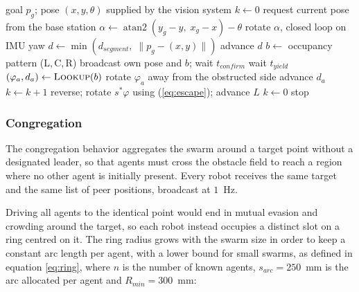 \documentclass[conference]{IEEEtran}
\begin{document}
\begin{algorithm}
\caption{Goal-directed navigation with obstacle avoidance}
\label{alg:nav}
\begin{algorithmic}[1]
\REQUIRE goal $p_g$; pose $(x,y,\theta)$ supplied by the vision system
\STATE $k \leftarrow 0$ 
    \STATE request current pose from the base station
    \STATE $\alpha \leftarrow \operatorname{atan2}(y_g - y,\; x_g - x) - \theta$
        \STATE rotate $\alpha$, closed loop on IMU yaw
    \ENDIF
    \STATE $d \leftarrow \min \left( d_{segment},\; \lVert p_g - (x,y) \rVert \right)$
    \STATE advance $d$
        \STATE $b \leftarrow$ occupancy pattern (L,\,C,\,R)
        \STATE broadcast own pose and $b$; wait $t_{confirm}$
            \STATE wait $t_{yield}$ 
        \ELSE
            \STATE $(\varphi_a, d_a) \leftarrow \textsc{Lookup}(b)$
            \STATE rotate $\varphi_a$ away from the obstructed side
            \STATE advance $d_a$
            \STATE $k \leftarrow k + 1$
        \ENDIF
            \STATE reverse; rotate $s^{*}\varphi$ using (\ref{eq:escape});
                   advance $L$
            \STATE $k \leftarrow 0$
        \ENDIF
    \ENDIF
\ENDWHILE
\STATE stop
\end{algorithmic}
\end{algorithm}

\subsubsection{Congregation}
The congregation behavior aggregates the swarm around a target point without a
designated leader, so that agents must cross the obstacle field to reach a
region where no other agent is initially present. Every robot receives the same
target and the same list of peer positions, broadcast at $1$~Hz.

Driving all agents to the identical point would end in mutual evasion and
crowding around the target, so each robot instead occupies a distinct slot on a
ring centred on it. The ring radius grows with the swarm size in order to keep a
constant arc length per agent, with a lower bound for small swarms, as defined in
equation \ref{eq:ring}, where $n$ is the number of known agents,
$s_{arc} = 250$~mm is the arc allocated per agent and $R_{min} = 300$~mm:
\end{document}
